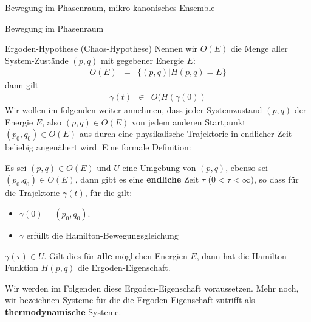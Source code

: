 \begin{chapter}{\titlestr}
\begin{section}{Bewegung im Phasenraum, mikro-kanonisches Ensemble}
\begin{subsection}{Bewegung im Phasenraum}
\begin{subsubsection}{Ergoden-Hypothese (Chaos-Hypothese)}
Nennen wir $O(E)$ die Menge aller System-Zustände $(p,q)$ mit gegebener Energie $E$:
\begin{eqnarray*}
O(E) &=& \{(p,q)|H(p,q)=E\}
\end{eqnarray*}
dann gilt
\begin{eqnarray*}
\gamma(t) &\in& O(H(\gamma(0))
\end{eqnarray*}
Wir wollen im folgenden weiter annehmen, dass jeder Systemzustand $(p,q)$ der Energie $E$, also $(p,q)\in O(E)$ von jedem anderen Startpunkt $(p_0,q_0)\in O(E)$ aus durch eine physikalische Trajektorie in endlicher Zeit beliebig angenähert wird. Eine formale Definition:
\begin{definition}
Es sei $(p,q)\in O(E)$ und $U$ eine Umgebung von $(p,q)$, ebenso sei $(p_0.q_0)\in O(E)$, dann gibt es eine \textbf{endliche} Zeit $\tau$ ($0<\tau<\infty$), so dass für die Trajektorie $\gamma(t)$, für die gilt:
\begin{itemize}
	\item $\gamma(0) = (p_0, q_0)$.
	\item $\gamma$ erfüllt die Hamilton-Bewegungsgleichung
\end{itemize}
$\gamma(\tau)\in U$. Gilt dies für \textbf{alle} möglichen Energien $E$, dann hat die Hamilton-Funktion $H(p,q)$ die Ergoden-Eigenschaft.
\end{definition}
Wir werden im Folgenden diese Ergoden-Eigenschaft voraussetzen. Mehr noch, wir bezeichnen Systeme für die die Ergoden-Eigenschaft zutrifft als \textbf{thermodynamische} Systeme.
\end{subsubsection}
\end{subsection}



\end{section}
\end{chapter}
